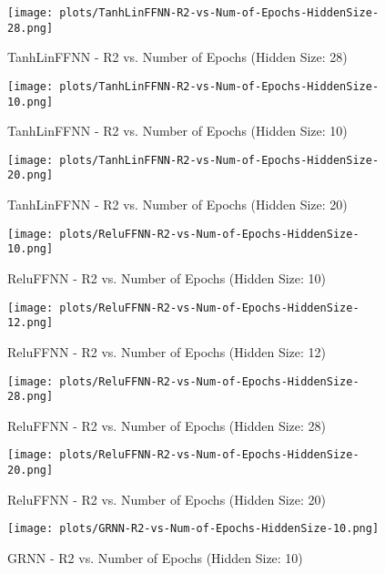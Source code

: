 \begin{figure}[H]
    \centering
    \texttt{[image: plots/TanhLinFFNN-R2-vs-Num-of-Epochs-HiddenSize-28.png]}
    \caption{TanhLinFFNN - R2 vs. Number of Epochs (Hidden Size: 28)}
\end{figure}

\begin{figure}[H]
    \centering
    \texttt{[image: plots/TanhLinFFNN-R2-vs-Num-of-Epochs-HiddenSize-10.png]}
    \caption{TanhLinFFNN - R2 vs. Number of Epochs (Hidden Size: 10)}
\end{figure}

\begin{figure}[H]
    \centering
    \texttt{[image: plots/TanhLinFFNN-R2-vs-Num-of-Epochs-HiddenSize-20.png]}
    \caption{TanhLinFFNN - R2 vs. Number of Epochs (Hidden Size: 20)}
\end{figure}

\begin{figure}[H]
    \centering
    \texttt{[image: plots/ReluFFNN-R2-vs-Num-of-Epochs-HiddenSize-10.png]}
    \caption{ReluFFNN - R2 vs. Number of Epochs (Hidden Size: 10)}
\end{figure}

\begin{figure}[H]
    \centering
    \texttt{[image: plots/ReluFFNN-R2-vs-Num-of-Epochs-HiddenSize-12.png]}
    \caption{ReluFFNN - R2 vs. Number of Epochs (Hidden Size: 12)}
\end{figure}

\begin{figure}[H]
    \centering
    \texttt{[image: plots/ReluFFNN-R2-vs-Num-of-Epochs-HiddenSize-28.png]}
    \caption{ReluFFNN - R2 vs. Number of Epochs (Hidden Size: 28)}
\end{figure}

\begin{figure}[H]
    \centering
    \texttt{[image: plots/ReluFFNN-R2-vs-Num-of-Epochs-HiddenSize-20.png]}
    \caption{ReluFFNN - R2 vs. Number of Epochs (Hidden Size: 20)}
\end{figure}

\begin{figure}[H]
    \centering
    \texttt{[image: plots/GRNN-R2-vs-Num-of-Epochs-HiddenSize-10.png]}
    \caption{GRNN - R2 vs. Number of Epochs (Hidden Size: 10)}
\end{figure}

